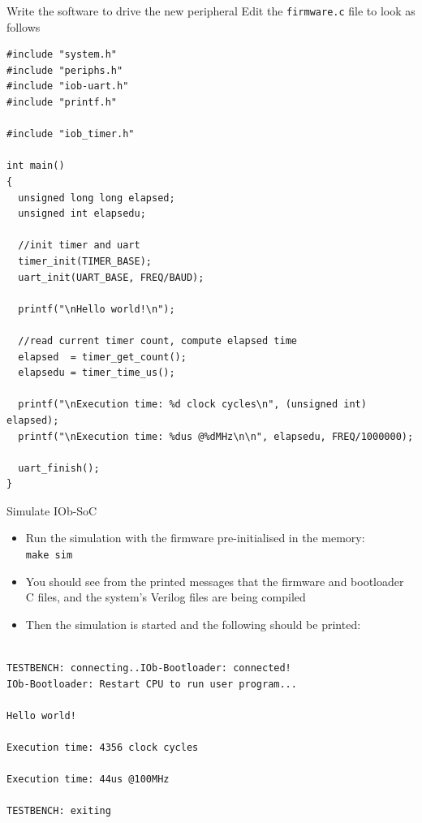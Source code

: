 \documentclass [xcolor=svgnames, t] {beamer}
\begin{document}
\begin{frame}[fragile]{Write the software to drive the new peripheral}
  Edit the {\tt firmware.c} file to look as follows
  \begin{tiny}
    \begin{lstlisting}
#include "system.h"
#include "periphs.h"
#include "iob-uart.h"
#include "printf.h"
      
#include "iob_timer.h"

int main()
{
  unsigned long long elapsed;
  unsigned int elapsedu;

  //init timer and uart
  timer_init(TIMER_BASE);
  uart_init(UART_BASE, FREQ/BAUD);

  printf("\nHello world!\n");

  //read current timer count, compute elapsed time
  elapsed  = timer_get_count();
  elapsedu = timer_time_us();

  printf("\nExecution time: %d clock cycles\n", (unsigned int) elapsed);
  printf("\nExecution time: %dus @%dMHz\n\n", elapsedu, FREQ/1000000);

  uart_finish();
}
    \end{lstlisting}
  \end{tiny}
\end{frame}


\begin{frame}[fragile]{Simulate IOb-SoC}
\begin{itemize}
\item Run the simulation with the firmware pre-initialised in the memory:\\
  {\tt make sim}
\item You should see from the printed messages that the firmware and bootloader C files, and the system's Verilog files are being compiled
\item Then the simulation is started and the following should be printed:
\end{itemize}

\begin{tiny}
  \begin{lstlisting}

TESTBENCH: connecting..IOb-Bootloader: connected!
IOb-Bootloader: Restart CPU to run user program...

Hello world!

Execution time: 4356 clock cycles

Execution time: 44us @100MHz

TESTBENCH: exiting

  \end{lstlisting}
\end{tiny}
\end{frame}
\end{document}
